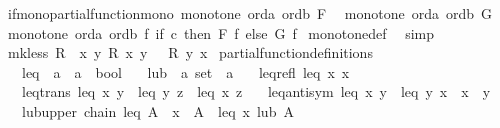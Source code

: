 \begin{isabellebody}
\ if{\isacharunderscore}{\kern0pt}mono{\isacharbrackleft}{\kern0pt}partial{\isacharunderscore}{\kern0pt}function{\isacharunderscore}{\kern0pt}mono{\isacharbrackright}{\kern0pt}{\isacharcolon}{\kern0pt}\ {\isachardoublequoteopen}monotone\ orda\ ordb\ F\ \isanewline
{\isasymLongrightarrow}\ monotone\ orda\ ordb\ G\isanewline
{\isasymLongrightarrow}\ monotone\ orda\ ordb\ {\isacharparenleft}{\kern0pt}{\isasymlambda}f{\isachardot}{\kern0pt}\ if\ c\ then\ F\ f\ else\ G\ f{\isacharparenright}{\kern0pt}{\isachardoublequoteclose}\isanewline
%
\isadelimproof
%
\endisadelimproof
%
\isatagproof
{}\isamarkupfalse%
\ monotone{\isacharunderscore}{\kern0pt}def\ \isamarkupfalse%
\ simp%
\endisatagproof
{\isafoldproof}%
%
\isadelimproof
\isanewline
%
\endisadelimproof
\isanewline
{}\isamarkupfalse%
\ {\isachardoublequoteopen}mk{\isacharunderscore}{\kern0pt}less\ R\ {\isacharequal}{\kern0pt}\ {\isacharparenleft}{\kern0pt}{\isasymlambda}x\ y{\isachardot}{\kern0pt}\ R\ x\ y\ {\isasymand}\ {\isasymnot}\ R\ y\ x{\isacharparenright}{\kern0pt}{\isachardoublequoteclose}\isanewline
\isanewline
{}\isamarkupfalse%
\ partial{\isacharunderscore}{\kern0pt}function{\isacharunderscore}{\kern0pt}definitions\ {\isacharequal}{\kern0pt}\ \isanewline
\ \ \ leq\ {\isacharcolon}{\kern0pt}{\isacharcolon}{\kern0pt}\ {\isachardoublequoteopen}{\isacharprime}{\kern0pt}a\ {\isasymRightarrow}\ {\isacharprime}{\kern0pt}a\ {\isasymRightarrow}\ bool{\isachardoublequoteclose}\isanewline
\ \ \ lub\ {\isacharcolon}{\kern0pt}{\isacharcolon}{\kern0pt}\ {\isachardoublequoteopen}{\isacharprime}{\kern0pt}a\ set\ {\isasymRightarrow}\ {\isacharprime}{\kern0pt}a{\isachardoublequoteclose}\isanewline
\ \ \ leq{\isacharunderscore}{\kern0pt}refl{\isacharcolon}{\kern0pt}\ {\isachardoublequoteopen}leq\ x\ x{\isachardoublequoteclose}\isanewline
\ \ \ leq{\isacharunderscore}{\kern0pt}trans{\isacharcolon}{\kern0pt}\ {\isachardoublequoteopen}leq\ x\ y\ {\isasymLongrightarrow}\ leq\ y\ z\ {\isasymLongrightarrow}\ leq\ x\ z{\isachardoublequoteclose}\isanewline
\ \ \ leq{\isacharunderscore}{\kern0pt}antisym{\isacharcolon}{\kern0pt}\ {\isachardoublequoteopen}leq\ x\ y\ {\isasymLongrightarrow}\ leq\ y\ x\ {\isasymLongrightarrow}\ x\ {\isacharequal}{\kern0pt}\ y{\isachardoublequoteclose}\isanewline
\ \ \ lub{\isacharunderscore}{\kern0pt}upper{\isacharcolon}{\kern0pt}\ {\isachardoublequoteopen}chain\ leq\ A\ {\isasymLongrightarrow}\ x\ {\isasymin}\ A\ {\isasymLongrightarrow}\ leq\ x\ {\isacharparenleft}{\kern0pt}lub\ A{\isacharparenright}{\kern0pt}{\isachardoublequoteclose}\isanewline

\end{isabellebody}
